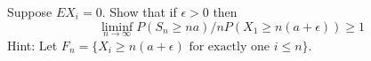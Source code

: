   \begin{exercise}[Durrett 2.7.6]
    Suppose $EX_i = 0$. Show that if $\epsilon > 0$ then
    \begin{equation*}
      \liminf_{n \to \infty} P(S_n \geq na)/nP(X_1 \geq n(a + \epsilon)) \geq 1
    \end{equation*}
    Hint: Let $F_n = \{X_i \geq n(a + \epsilon) \text{ for exactly one } i \leq n\}$.
  \end{exercise}
  \begin{solution}

  \end{solution}


